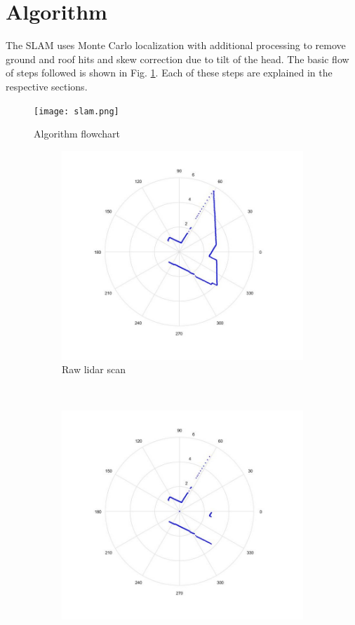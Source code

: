 \documentclass[fleqn,10pt]{SelfArx} %
\begin{document}
\section{Algorithm}
\label{sec:algo}
The SLAM uses Monte Carlo localization with additional processing to remove ground and roof hits and skew correction due to tilt of the head. The basic flow of steps followed is shown in Fig. \ref{fig:algo}. Each of these steps are explained in the respective sections.

\begin{figure}[hbtp]
\centering
\texttt{[image: slam.png]}
\caption{Algorithm flowchart}
\label{fig:algo}
\end{figure}

\begin{figure}
    \centering
    \begin{subfigure}[t]{0.3\textwidth}
        \centering
        \includegraphics[scale = 0.3]{raw.jpg}
        \caption{Raw lidar scan}
    \end{subfigure}%
    ~ 
    \begin{subfigure}[t]{0.3\textwidth}
        \centering
        \includegraphics[scale = 0.3]{gr.jpg}

\end{subfigure}
\end{figure}
\end{document}
